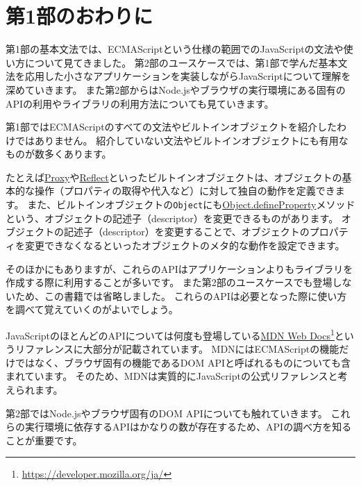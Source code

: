 \hypertarget{end-of-basic-grammar}{%
\chapter*{第1部のおわりに}\label{end-of-basic-grammar}}
\thispagestyle{frontheadings}

第1部の基本文法では、ECMAScriptという仕様の範囲でのJavaScriptの文法や使い方について見てきました。
第2部のユースケースでは、第1部で学んだ基本文法を応用した小さなアプリケーションを実装しながらJavaScriptについて理解を深めていきます。
また第2部からはNode.jsやブラウザの実行環境にある固有のAPIの利用やライブラリの利用方法についても見ていきます。

第1部ではECMAScriptのすべての文法やビルトインオブジェクトを紹介したわけではありません。
紹介していない文法やビルトインオブジェクトにも有用なものが数多くあります。

たとえば\href{https://developer.mozilla.org/ja/docs/Web/JavaScript/Reference/Global_Objects/Proxy}{Proxy}や\href{https://developer.mozilla.org/ja/docs/Web/JavaScript/Reference/Global_Objects/Reflect}{Reflect}といったビルトインオブジェクトは、オブジェクトの基本的な操作（プロパティの取得や代入など）に対して独自の動作を定義できます。
また、ビルトインオブジェクトの\texttt{Object}にも\href{https://developer.mozilla.org/ja/docs/Web/JavaScript/Reference/Global_Objects/Object/defineProperty}{Object.defineProperty}メソッドという、オブジェクトの記述子（descriptor）を変更できるものがあります。
オブジェクトの記述子（descriptor）を変更することで、オブジェクトのプロパティを変更できなくなるといったオブジェクトのメタ的な動作を設定できます。

そのほかにもありますが、これらのAPIはアプリケーションよりもライブラリを作成する際に利用することが多いです。
また第2部のユースケースでも登場しないため、この書籍では省略しました。
これらのAPIは必要となった際に使い方を調べて覚えていくのがよいでしょう。

JavaScriptのほとんどのAPIについては何度も登場している\href{https://developer.mozilla.org/ja/}{MDN
Web Docs}\footnote{\url{https://developer.mozilla.org/ja/}}というリファレンスに大部分が記載されています。
MDNにはECMAScriptの機能だけではなく、ブラウザ固有の機能であるDOM
APIと呼ばれるものについても含まれています。
そのため、MDNは実質的にJavaScriptの公式リファレンスと考えられます。

第2部ではNode.jsやブラウザ固有のDOM APIについても触れていきます。
これらの実行環境に依存するAPIはかなりの数が存在するため、APIの調べ方を知ることが重要です。

